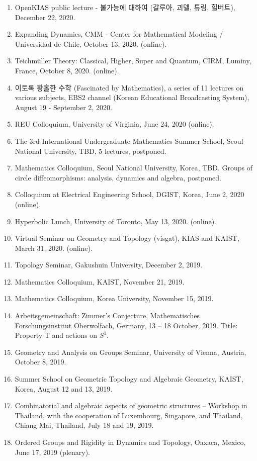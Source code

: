 \documentclass[11pt,a4paper]{article}
\begin{document}
\begin{enumerate}[leftmargin=1.5em, label=\arabic*.]
\item OpenKIAS public lecture - 불가능에 대하여 (갈루아, 괴델, 튜링, 힐버트), December 22, 2020.
\item Expanding Dynamics, CMM - Center for Mathematical Modeling / Universidad de Chile, October 13, 2020. (online).
\item Teichmüller Theory: Classical, Higher, Super and Quantum, CIRM, Luminy, France, October 8, 2020. (online).
\item 이토록 황홀한 수학 (Fascinated by Mathematics), a series of 11 lectures on various subjects, EBS2 channel (Korean Educational Broadcasting System), August 19 - September 2, 2020.
\item REU Colloquium, University of Virginia, June 24, 2020 (online).
\item The 3rd International Undergraduate Mathematics Summer School, Seoul National University, TBD, 5 lectures, postponed.
\item Mathematics Colloquium, Seoul National University, Korea, TBD. Groups of circle diffeomorphisms: analysis, dynamics and algebra, postponed.
\item Colloquium at Electrical Engineering School, DGIST, Korea, June 2, 2020 (online).
\item Hyperbolic Lunch, University of Toronto, May 13, 2020. (online).
\item Virtual Seminar on Geometry and Topology (visgat), KIAS and KAIST, March 31, 2020. (online).
\item Topology Seminar, Gakushuin University, December 2, 2019.
\item Mathematics Colloquium, KAIST, November 21, 2019.
\item Mathematics Colloquium, Korea University, November 15, 2019.
\item Arbeitsgemeinschaft: Zimmer's Conjecture, Mathematisches Forschungsinstitut Oberwolfach, Germany, 13 -- 18 October, 2019. Title: Property T and actions on $S^1$.
\item Geometry and Analysis on Groups Seminar, University of Vienna, Austria, October 8, 2019.
\item Summer School on Geometric Topology and Algebraic Geometry, KAIST, Korea, August 12 and 13, 2019.
\item Combinatorial and algebraic aspects of geometric structures -- Workshop in Thailand, with the cooperation of Luxembourg, Singapore, and Thailand, Chiang Mai, Thailand, July 18 and 19, 2019.
\item Ordered Groups and Rigidity in Dynamics and Topology, Oaxaca, Mexico, June 17, 2019 (plenary).

\end{enumerate}
\end{document}
